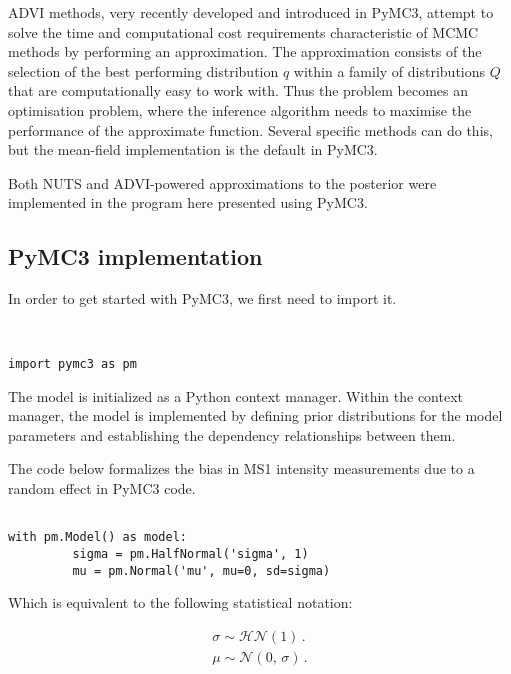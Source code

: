 \ac{ADVI} methods, very recently developed and introduced in PyMC3, attempt to solve the time and computational cost requirements characteristic of \ac{MCMC} methods by performing an approximation. The approximation consists of the selection of the best performing distribution $q$ within a family of distributions $Q$ that are computationally easy to work with. Thus the problem becomes an optimisation problem, where the inference algorithm needs to maximise the performance of the approximate function. Several specific methods can do this, but the mean-field implementation  is the default in PyMC3.

Both NUTS and ADVI-powered approximations to the posterior were implemented in the program here presented using PyMC3.


\subsection{PyMC3 implementation}

In order to get started with PyMC3, we first need to import it.

\begin{verbatim}


import pymc3 as pm              
\end{verbatim}

The model is initialized as a Python context manager. Within the context manager, the model is implemented by defining prior distributions for the model parameters and establishing the dependency relationships between them.

The code below formalizes the bias in \ac{MS1} intensity measurements due to a random effect in PyMC3 code.

\begin{verbatim}

with pm.Model() as model:             
         sigma = pm.HalfNormal('sigma', 1)
         mu = pm.Normal('mu', mu=0, sd=sigma)
\end{verbatim}


Which is equivalent to the following statistical notation:

\begin{align}
\sigma \sim \mathcal{HN}(1)\,.  \\
\mu \sim \mathcal{N}(0,\,\sigma)\,.
\end{align}

